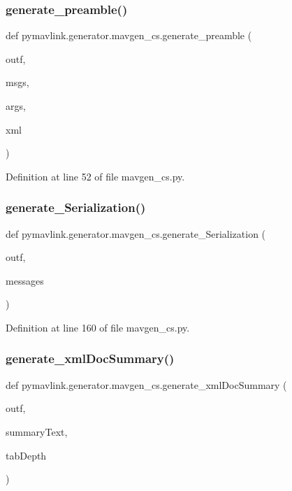 \subsubsection{\texorpdfstring{generate\_preamble()}{generate\_preamble()}}
{\footnotesize\ttfamily def pymavlink.\+generator.\+mavgen\+\_\+cs.\+generate\+\_\+preamble (\begin{DoxyParamCaption}\item[{}]{outf,  }\item[{}]{msgs,  }\item[{}]{args,  }\item[{}]{xml }\end{DoxyParamCaption})}



Definition at line 52 of file mavgen\+\_\+cs.\+py.

\mbox{\label{namespacepymavlink_1_1generator_1_1mavgen__cs_a1b4c53af7bc25e5cb3f2a3d2e67deeee}} 
\subsubsection{\texorpdfstring{generate\_Serialization()}{generate\_Serialization()}}
{\footnotesize\ttfamily def pymavlink.\+generator.\+mavgen\+\_\+cs.\+generate\+\_\+\+Serialization (\begin{DoxyParamCaption}\item[{}]{outf,  }\item[{}]{messages }\end{DoxyParamCaption})}



Definition at line 160 of file mavgen\+\_\+cs.\+py.

\mbox{\label{namespacepymavlink_1_1generator_1_1mavgen__cs_a9915c2abe90b770671bcb76ff7752a9a}} 
\subsubsection{\texorpdfstring{generate\_xmlDocSummary()}{generate\_xmlDocSummary()}}
{\footnotesize\ttfamily def pymavlink.\+generator.\+mavgen\+\_\+cs.\+generate\+\_\+xml\+Doc\+Summary (\begin{DoxyParamCaption}\item[{}]{outf,  }\item[{}]{summary\+Text,  }\item[{}]{tab\+Depth }\end{DoxyParamCaption})}



